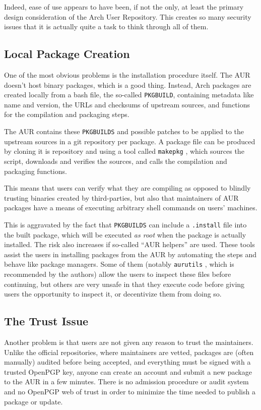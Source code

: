 Indeed, ease of use appears to have been, if not the only, at least the primary design consideration of the Arch User Repository. This creates so many security issues that it is actually quite a task to think through all of them.

\subsection*{Local Package Creation}
One of the most obvious problems is the installation procedure itself.
The AUR doesn't host binary packages, which is a good thing. Instead, Arch packages are created locally from a bash file, the so-called \texttt{PKGBUILD}, containing metadata like name and version, the URLs and checksums of upstream sources, and functions for the compilation and packaging steps. %

The AUR contains these \texttt{PKGBUILDS} and possible patches to be applied to the upstream sources in a git repository per package.
A package file can be produced by cloning it is repository and using a tool called \texttt{makepkg} \cite{wiki:PackageCreation}, which sources the script, downloads and verifies the sources, and calls the compilation and packaging functions.

This means that users can verify what they are compiling as opposed to blindly trusting binaries created by third-parties, but also that maintainers of AUR packages have a means of executing arbitrary shell commands on users' machines.

This is aggravated by the fact that \texttt{PKGBUILDS} can include a \texttt{.install} file into the built package, which will be executed \emph{as root} when the package is actually installed.
The risk also increases if so-called \enquote{AUR helpers} are used. These tools assist the users in installing packages from the AUR by automating the steps and behave like package managers.
Some of them (notably \texttt{aurutils} \cite{gh:aurutils}, which is recommended by the authors) allow the users to inspect these files before continuing, but others are very unsafe in that they execute code before giving users the opportunity to inspect it, or decentivize them from doing so.

\subsection*{The Trust Issue}
Another problem is that users are not given any reason to trust the maintainers.
Unlike the official repositories, where maintainers are vetted, packages are (often manually) audited before being accepted, and everything must be signed with a trusted OpenPGP key, anyone can create an account and submit a new package to the AUR in a few minutes.
There is no admission procedure or audit system and no OpenPGP web of trust in order to minimize the time needed to publish a package or update.

